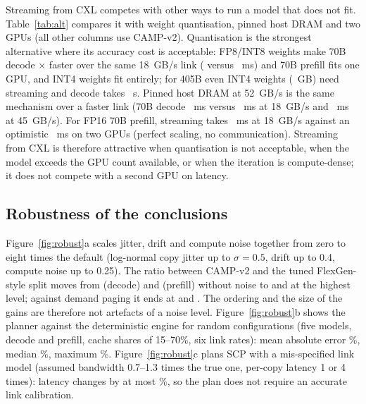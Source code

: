 \documentclass[preprint,12pt]{elsarticle}
\newcommand{\camp}{\textsc{CAMP}}
\begin{document}
Streaming from CXL competes with other ways to run a model that does not fit. Table~\ref{tab:alt} compares it with weight quantisation, pinned host DRAM and two GPUs (all other columns use \camp-v2). Quantisation is the strongest alternative where its accuracy cost is acceptable: FP8/INT8 weights make 70B decode \nAltSeventyEightDecRatio$\times$ faster over the same 18~GB/s link (\nAltSeventyEightDec{} versus \nAltSeventyFpDec~ms) and 70B prefill fits one GPU, and INT4 weights fit entirely; for 405B even INT4 weights (\nAltFourOhFiveFourWeights~GB) need streaming and decode takes \nAltFourOhFiveFourDec~s. Pinned host DRAM at 52~GB/s is the same mechanism over a faster link (70B decode \nAltSeventyFpHostDec~ms versus \nAltSeventyFpDec~ms at 18~GB/s and \nAltSeventyFpCxlFortyFiveDec~ms at 45~GB/s). For FP16 70B prefill, streaming takes \nAltSeventyFpPre~ms at 18~GB/s against an optimistic \nAltSeventyTwoGpuPre~ms on two GPUs (perfect scaling, no communication). Streaming from CXL is therefore attractive when quantisation is not acceptable, when the model exceeds the GPU count available, or when the iteration is compute-dense; it does not compete with a second GPU on latency.



\subsection{Robustness of the conclusions}
\label{sec:res-robust}

Figure~\ref{fig:robust}a scales jitter, drift and compute noise together from zero to eight times the default (log-normal copy jitter up to $\sigma=0.5$, drift up to 0.4, compute noise up to 0.25). The ratio between \camp-v2 and the tuned FlexGen-style split moves from \nNoiseZeroDecCampOverFg{} (decode) and \nNoiseZeroPreCampOverFg{} (prefill) without noise to \nNoiseHiDecCampOverFg{} and \nNoiseHiPreCampOverFg{} at the highest level; against demand paging it ends at \nNoiseHiDecCampOverDem{} and \nNoiseHiPreCampOverDem. The ordering and the size of the gains are therefore not artefacts of a noise level. Figure~\ref{fig:robust}b shows the planner against the deterministic engine for \nPlannerCount{} random configurations (five models, decode and prefill, cache shares of 15--70\%, six link rates): mean absolute error \nPlannerMape\%, median \nPlannerMedian\%, maximum \nPlannerMax\%. Figure~\ref{fig:robust}c plans SCP with a mis-specified link model (assumed bandwidth 0.7--1.3 times the true one, per-copy latency 1 or 4 times): latency changes by at most \nLinkBiasMaxPct\%, so the plan does not require an accurate link calibration.
\end{document}
